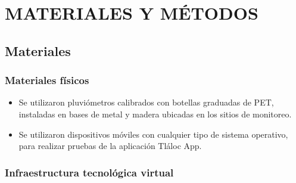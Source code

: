 \chapter{MATERIALES Y MÉTODOS}










\section{Materiales}
\subsection{Materiales físicos}
\begin{itemize}
    \item Se utilizaron pluviómetros calibrados con botellas graduadas de PET, instaladas en bases de metal y madera ubicadas en los sitios de monitoreo.

    \item Se utilizaron dispositivos móviles con cualquier tipo de sistema operativo, para realizar pruebas de la aplicación Tláloc App.
\end{itemize}

\subsection{Infraestructura tecnológica virtual}


